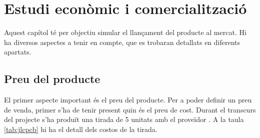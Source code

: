 \chapter{Estudi econòmic i comercialització}
\label{cap:economia}

Aquest capítol té per objectiu simular el llançament del producte al mercat.
Hi ha diversos aspectes a tenir en compte, que es trobaran detallats en
diferents apartats.

\section{Preu del producte}

El primer aspecte important és el preu del producte. Per a poder definir un
preu de venda, primer s'ha de tenir present quin és el preu de cost. Durant
el transcurs del projecte s'ha produït una tirada de 5 unitats amb el
proveïdor . A la taula \ref{tab:jlcpcb} hi ha el detall dels
costos de la tirada.

